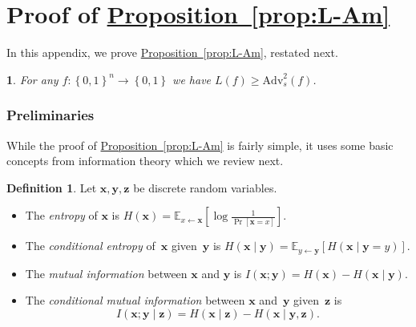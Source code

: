\documentclass[11pt]{article}
\makeatletter
\numberwithin{equation}{section}
\theoremstyle{definition}
\newtheorem{definition}[theorem]{Definition}
\theoremstyle{plain}
\newcommand{\expref}[2]{\hyperref[#2]{#1~\ref{#2}}}
\theoremstyle{definition}\newtheorem{notation}[theorem]{Notation}\theoremstyle{plain}
\newcommand{\E}{\mathbb{E}}
\newcommand{\B}{\left\{ 0,1 \right \}}
\newcommand{\x}{\boldsymbol{x}}
\newcommand{\y}{\boldsymbol{y}}
\newcommand{\z}{\boldsymbol{z}}
\newcommand{\Am}{\mathrm{Adv}_{s}}
\theoremstyle{definition}
\theoremstyle{plain}
\newtheorem*{restated@theorem}{\rep@title}
\newenvironment{restated}[1]{%
	 \def\rep@title{#1}%
	 \begin{restated@theorem}}%
	{\end{restated@theorem}}
\makeatother
\begin{document}
\appendix

\section{\label{sec:L-Am}Proof of \expref{Proposition}{prop:L-Am}}

In this appendix, we prove \expref{Proposition}{prop:L-Am}, restated next. 
\begin{restated}{\expref{Proposition}{prop:L-Am}}
For any $f\colon\B^{n}\to\B$ we have $L(f)\geq\Am^{2}(f)$. 
\end{restated}


\subsubsection*{Preliminaries}

While the proof of \expref{Proposition}{prop:L-Am} is fairly simple, it uses some basic
concepts from information theory which we review next. 
\begin{definition}
\label{def:information}Let $\x,\y,\z$ be discrete random variables. 
\begin{itemize}
\item The \emph{entropy} of $\x$ is $H(\x)=\E_{x\gets\x}\left[\log\frac{1}{\Pr\!\left[\x=x\right]}\right]$. 
\item The \emph{conditional entropy} of~$\x$ given~$\y$ is $H(\x\mid\y)=\E_{y\gets\y}\left[H\left(\x\mid\y=y\right)\right]$. 
\item The \emph{mutual information} between $\x$ and $\y$ is $I(\x;\y)=H(\x)-H(\x\mid\y).$ 
\item The \emph{conditional mutual information} between $\x$ and~$\y$
given~$\z$ is 
\[
I(\x;\y\mid\z)=H(\x\mid\z)-H(\x\mid\y,\z).
\]
\end{itemize}
\end{definition}
\end{document}
